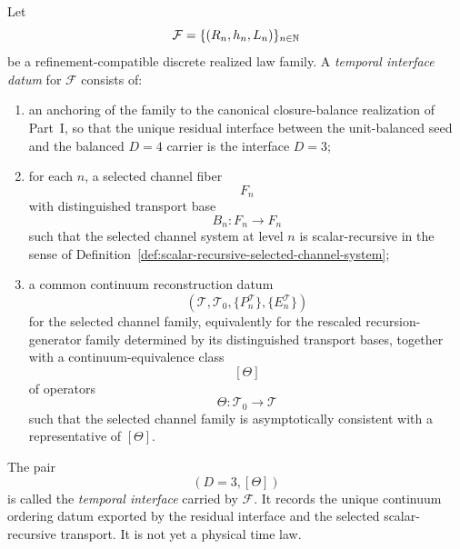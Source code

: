 \begin{definition}
\label{def:temporal-interface-datum}
Let
\[
\mathcal F=\{(R_n,h_n,L_n)\}_{n\in\mathbb{N}}
\]
be a refinement-compatible discrete realized law family. A
\emph{temporal interface datum} for \(\mathcal F\) consists of:
\begin{enumerate}[label=(\roman*), leftmargin=2em, itemsep=0.2em]
\item an anchoring of the family to the canonical closure-balance realization
      of Part~I, so that the unique residual interface between the
      unit-balanced seed and the balanced \(D=4\) carrier is the interface
      \(D=3\);
\item for each \(n\), a selected channel fiber
      \[
      F_n
      \]
      with distinguished transport base
      \[
      B_n:F_n\to F_n
      \]
      such that the selected channel system at level \(n\) is
      scalar-recursive in the sense of
      Definition~\ref{def:scalar-recursive-selected-channel-system};
\item a common continuum reconstruction datum
      \[
      (\mathcal T,\mathcal T_0,\{P_n^{\mathcal T}\},\{E_n^{\mathcal T}\})
      \]
      for the selected channel family, equivalently for the rescaled
      recursion-generator family determined by its distinguished transport
      bases, together with a continuum-equivalence class
      \[
      [\Theta]
      \]
      of operators
      \[
      \Theta:\mathcal T_0\to\mathcal T
      \]
      such that the selected channel family is asymptotically consistent with
      a representative of \([\Theta]\).
\end{enumerate}
The pair
\[
(D=3,[\Theta])
\]
is called the \emph{temporal interface} carried by \(\mathcal F\). It records
the unique continuum ordering datum exported by the residual interface and the
selected scalar-recursive transport. It is not yet a physical time law.
\end{definition}

